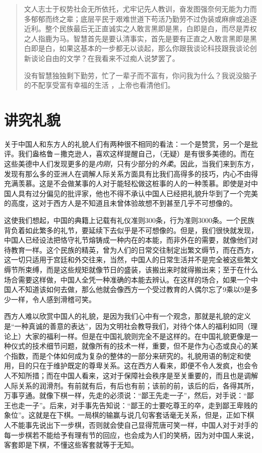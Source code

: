 \documentclass[12pt,oneside]{book}
\begin{document}
\begin{common-format}
\begin{quotation}
文人志士于权势社会无所依托，尤牢记先人教训，奋发图强奈何无能为力而多郁郁而终之辈；底层平民于艰难世道下苟活乃勤劳不过伪装或麻痹或追逐近利。整个民族最后无正直诚实之人敢言黑即是黑，白即是白，而尽是弄权之人指鹿为马。智慧首先是要认清事实，首先是要有正直之人敢言黑即是黑白即是白，如果这基本的一步都无以谈起，那么你跟我谈论科技跟我谈论创新谈论自由的文学？在我看来不过痴人说梦罢了。

没有智慧独独剩下勤劳，忙了一辈子而不富有，你问我为什么？我说没脑子的不配享受富有幸福的生活 ，上帝也看清他们。
\end{quotation}


\chapter{讲究礼貌}
关于中国人和东方人的礼貌人们有两种很不相同的看法：一个是赞赏，另一个是批评。我们盎格鲁－撒克逊人，喜欢这样提醒自己，（无疑）是有很多美德的。而在这些美德中人们发现更多的是\textit{内刚}，只有少部分的\textit{外柔}。因此，当我们来到东方，发现有那么多的亚洲人在调解人际关系方面具有比我们高得多的技巧，内心不由得充满羡慕。这是不会做某事的人对于能轻松做这桩事的人的一种羡慕。即使是对中国人具有过分偏见的批评家，他也不得不承认中国人已经把礼貌升华到了一个完美的高度，这对于西方人是不知道且未曾体验故想不到甚至几乎不可想像的。 

这使我们想起，中国的典籍上记载有礼仪准则300条，行为准则3000条。一个民族背负着如此繁多的礼节，要延续下去似乎是不可想像的。但是，我们很快就发现，中国人已经设法把恪守礼节熔铸成一种内在的本能，而非外在的需要，就像他们对待教育一样。这个民族的精英，曾为人们的日常交往制定出繁文缛节，而在西方，这一切只适用于宫廷和外交往来，当然，中国人的日常生活并不是完全被这些繁文缛节所束缚，而是这些规矩就像节日的盛装，该搬出来时就得搬出来；至于在什么场合需要这样做，中国人全凭一种准确的本能去辨认。在这样的场合，如果一个中国人不知道该如何去做，那么他就会像西方一个受过教育的人偶尔忘了9乘以9是多少一样，令人感到滑稽可笑。 

西方人难以欣赏中国人的礼貌，是因为我们心中有一个观念，那就是礼貌的定义是“一种真诚的善意的表达”，因为文明社会教导我们，对待个体人的福利如同（理论上）大家的福利一样。但是在中国礼貌则完全不是这样的。在中国礼貌更像是一种仪式的技术细节问题，就像所有的技术一样，重要，但不是作为心态或良心的某个指数，而是个体如何成为复杂的整体的一部分来研究的。礼貌用语的制定和使用，目的只在于维护既定的尊卑关系。这在西方人看来，即便不令人发疯，也会令人不知所措；而在中国人看来，这对于保障社会秩序是至关重要的，而且也是调解人际关系的润滑剂。有前就有后，有后也有前；该前的前，该后的后，各得其所，万事亨通。就像下棋一样，先走的必须说：“鄙王先走一子”，然后，对手说：“鄙王也走一子”。后来，对手事先告知说：“鄙王的士要吃尊王的卒，走到鄙王卑贱的象位”。这就是在下棋。一局棋的输赢与说几句客套话毫无关系，但是，正如下棋人不能事先说出下一步棋，否则就会使自己显得荒唐可笑一样，中国人对于对手的每一步棋若不能给予有理有节的回应，也会成为人们的笑柄，因为对中国人来说，客套即是下棋，不懂这些客套就等于无知。 


\end{common-format}
\end{document}
